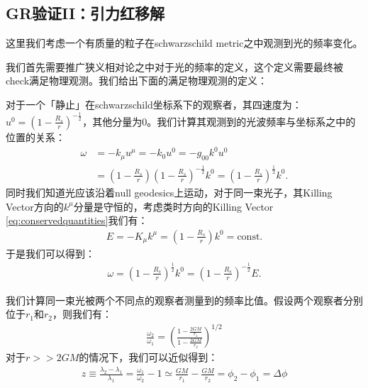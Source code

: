 \subsection{GR验证II：引力红移解}

这里我们考虑一个有质量的粒子在schwarzschild metric之中观测到光的频率变化。

\bigskip
{}

我们首先需要推广狭义相对论之中对于光的频率的定义，这个定义需要最终被check满足物理观测。我们给出下面的满足物理观测的定义：

\bigskip
{}

对于一个「静止」在schwarzschild坐标系下的观察者，其四速度为：$ u^0 =
\left(1-\frac{R_s}{r}\right)^{-\frac{1}{2}} $，其他分量为0。我们计算其观测到的光波频率与坐标系之中的位置的关系：
\begin{align}
  \omega &= -k_\mu u^\mu = -k_0 u^0 = -g_{00} k^0 u^0 \\
  &=
  \left(1-\frac{R_s}{r}\right)\left(1-\frac{R_s}{r}\right)^{-\frac{1}{2}}
  k^0 = \left(1-\frac{R_s}{r}\right)^{\frac{1}{2}} k^0.
\end{align}
同时我们知道光应该沿着null geodesics上运动，对于同一束光子，其Killing Vector方向的$ k^\mu
$分量是守恒的，考虑类时方向的Killing Vector \cref{eq:conservedquantities}我们有：
\begin{align}
  E = -K_\mu k^\mu = \left(1-\frac{R_s}{r}\right) k^0 = \text{const}.
\end{align}
于是我们可以得到：
\begin{align}
  \omega = \left(1-\frac{R_s}{r}\right)^{\frac{1}{2}} k^0 =
  \left(1-\frac{R_s}{r}\right)^{-\frac{1}{2}} E.
\end{align}

\bigskip
{}

我们计算同一束光被两个不同点的观察者测量到的频率比值。假设两个观察者分别位于$ r_1 $和$ r_2 $，则我们有：
\begin{align}
  \frac{\omega_2}{\omega_1}=\left(\frac{1-\frac{2GM}{r_1}}{1-\frac{2GM}{r_2}}\right)^{1/2}
\end{align}
对于$ r>> 2GM $的情况下，我们可以近似得到：
\begin{align}
  z\equiv\frac{\lambda_2-\lambda_1}{\lambda_1}=\frac{\omega_1}{\omega_2}-1\simeq\frac{GM}{r_1}-\frac{GM}{r_2}=\phi_2-\phi_1=\Delta\phi
\end{align}

